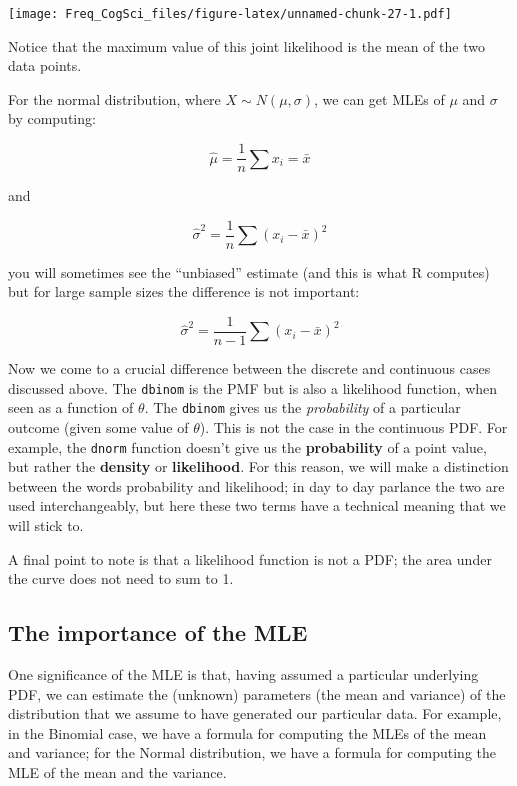 \documentclass[12pt,]{krantz}
\begin{document}
\texttt{[image: Freq\_CogSci\_files/figure-latex/unnamed-chunk-27-1.pdf]}

Notice that the maximum value of this joint likelihood is the mean of the two data points.

For the normal distribution, where \(X \sim N(\mu,\sigma)\), we can get MLEs of \(\mu\) and \(\sigma\) by computing:

\begin{equation}
  \hat \mu = \frac{1}{n}\sum x_i = \bar{x}  
\end{equation}

and

\begin{equation}
	\hat \sigma ^2 = \frac{1}{n}\sum (x_i-\bar{x})^2
\end{equation}

you will sometimes see the ``unbiased'' estimate (and this is what R computes) but for large sample sizes the difference is not important:

\begin{equation}
  \hat \sigma ^2 = \frac{1}{n-1}\sum (x_i-\bar{x})^2
\end{equation}

Now we come to a crucial difference between the discrete and continuous cases discussed above. The \texttt{dbinom} is the PMF but is also a likelihood function, when seen as a function of \(\theta\). The \texttt{dbinom} gives us the \emph{probability} of a particular outcome (given some value of \(\theta\)). This is not the case in the continuous PDF. For example, the \texttt{dnorm} function doesn't give us the \textbf{probability} of a point value, but rather the \textbf{density} or \textbf{likelihood}. For this reason, we will make a distinction between the words probability and likelihood; in day to day parlance the two are used interchangeably, but here these two terms have a technical meaning that we will stick to.

A final point to note is that a likelihood function is not a PDF; the area under the curve does not need to sum to 1.

\hypertarget{the-importance-of-the-mle}{%
\subsection{The importance of the MLE}\label{the-importance-of-the-mle}}

One significance of the MLE is that, having assumed a particular underlying PDF, we can estimate the (unknown) parameters (the mean and variance) of the distribution that we assume to have generated our particular data. For example, in the Binomial case, we have a formula for computing the MLEs of the mean and variance; for the Normal distribution, we have a formula for computing the MLE of the mean and the variance.
\end{document}
